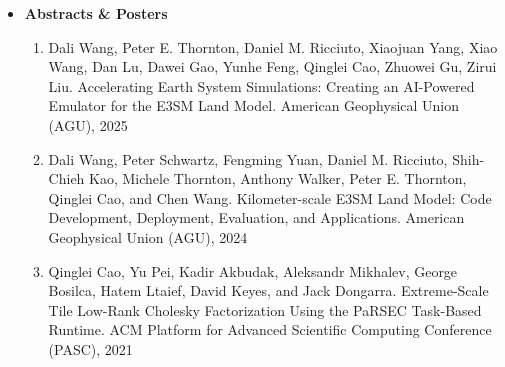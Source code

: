 \documentclass{resume} %
\let\OrigRSection\rSection
\let\OrigEndRSection\endrSection
\let\OrigMakeUppercase\MakeUppercase
\renewenvironment{rSection}[1]{
    \renewcommand{\MakeUppercase}[1]{\textcolor{blue}{\OrigMakeUppercase{##1}}}%
    \OrigRSection{#1}%
}{%
    \OrigEndRSection%
}
\begin{document}
\begin{rSection}{\faBook~Publications}
\begin{itemize}
\begin{enumerate}[leftmargin=8pt, align=left]
    \item Dong Zhong, {Qinglei Cao}, George Bosilca, and Jack Dongarra. Using long vector extensions for MPI reductions. Parallel Computing ({PARCO}), 2021 \hfill[\href{https://qingleicao.com/papers/Using long vector extensions for MPI reductions.pdf}{PDF}]
   \item {Qinglei Cao}, George Bosilca, Nuria Losada, Wei Wu, Dong Zhong, and Jack Dongarra. Evaluating data redistribution in parsec. IEEE Transactions on Parallel and Distributed Systems ({TPDS}), 2021\hfill[\href{https://qingleicao.com/papers/Evaluating Data Redistribution in PaRSEC.pdf}{PDF}]
  \end{enumerate}


  \item {\color{cyan} \bf Abstracts \& Posters} 
  
  \begin{enumerate}[leftmargin=8pt, align=left]%
    \item Dali Wang, Peter E. Thornton, Daniel M. Ricciuto, Xiaojuan Yang, Xiao Wang, Dan Lu, Dawei Gao, Yunhe Feng, Qinglei Cao, Zhuowei Gu, Zirui Liu. Accelerating Earth System Simulations: Creating an AI-Powered Emulator for the E3SM Land Model. American Geophysical Union (AGU), 2025
    \item Dali Wang, Peter Schwartz, Fengming Yuan, Daniel M. Ricciuto, Shih-Chieh Kao, Michele Thornton, Anthony Walker, Peter E. Thornton, Qinglei Cao, and Chen Wang. Kilometer-scale E3SM Land Model: Code Development, Deployment, Evaluation, and Applications. American Geophysical Union (AGU), 2024
    \item {Qinglei Cao}, Yu Pei, Kadir Akbudak, Aleksandr Mikhalev, George Bosilca, Hatem Ltaief, David Keyes, and Jack Dongarra. Extreme-Scale Tile Low-Rank Cholesky Factorization Using the PaRSEC Task-Based Runtime. ACM Platform for Advanced Scientific Computing Conference ({PASC}), 2021
  \end{enumerate}

\end{itemize}

\end{rSection}
\end{document}
